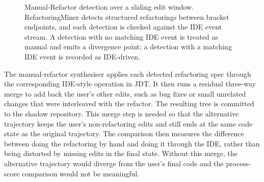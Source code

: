 \begin{figure}[H]
\caption{Manual-Refactor detection over a sliding edit window. RefactoringMiner detects structured refactorings between bracket endpoints, and each detection is checked against the IDE event stream. A detection with no matching IDE event is treated as manual and emits a divergence point; a detection with a matching IDE event is recorded as IDE-driven.}
\label{fig:methodology-manual-window}
\end{figure}

The manual-refactor synthesiser applies each detected refactoring spec through the corresponding IDE-style operation in JDT. It then runs a residual three-way merge to add back the user's other edits, such as bug fixes or small unrelated changes that were interleaved with the refactor. The resulting tree is committed to the shadow repository. This merge step is needed so that the alternative trajectory keeps the user's non-refactoring edits and still ends at the same code state as the original trajectory. The comparison then measures the difference between doing the refactoring by hand and doing it through the IDE, rather than being distorted by missing edits in the final state. Without this merge, the alternative trajectory would diverge from the user's final code and the process-score comparison would not be meaningful.

